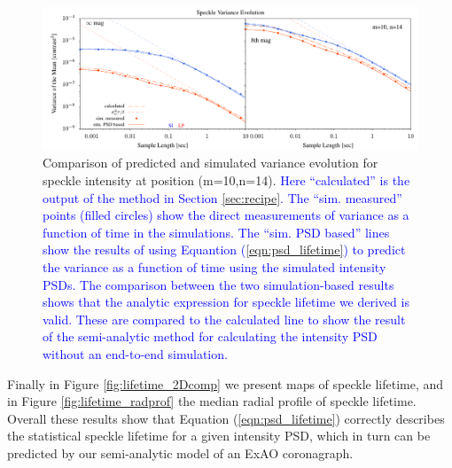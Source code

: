 \documentclass[10pt,preprint]{aastex631}
\newcommand{\jrmadd}[1]{\textcolor{blue}{#1}}
\begin{document}
\begin{figure}
\hspace{-0.3in}
\includegraphics[width=6.5in]{binVarComp_lp_10_14.pdf}
\caption{Comparison of predicted and simulated variance evolution for speckle intensity at position (m=10,n=14).  \jrmadd{Here ``calculated'' is the output of the method in Section \ref{sec:recipe}.  The ``sim. measured'' points (filled circles) show the direct measurements of variance as a function of time in the simulations.  The ``sim. PSD based'' lines show the results of using Equantion (\ref{eqn:psd_lifetime}) to predict the variance as a function of time using the simulated intensity PSDs.  The comparison between the two simulation-based results shows that the analytic expression for speckle lifetime we derived is valid.  These are compared to the calculated line to show the result of the semi-analytic method for calculating the intensity PSD without an end-to-end simulation.}  \label{fig:binvarcomp}}
\end{figure}

Finally in Figure \ref{fig:lifetime_2Dcomp} we present maps of speckle lifetime, and in Figure \ref{fig:lifetime_radprof} the median radial profile of speckle lifetime.  Overall these results show that Equation (\ref{eqn:psd_lifetime}) correctly describes the statistical speckle lifetime for a given intensity PSD, which in turn can be predicted by our semi-analytic model of an ExAO coronagraph.
\end{document}
